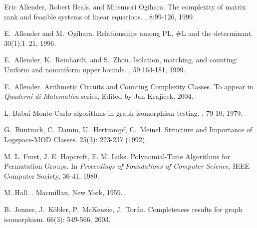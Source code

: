 \documentclass[11pt]{article}
\begin{document}
\begin{thebibliography}{MVV87}

Eric Allender, Robert Beals, and Mitsunori Ogihara.
\newblock The complexity of matrix rank and feasible systems of linear
  equations.
, 8:99-126, 1999.

E.~Allender and M.~Ogihara.
\newblock Relationships among {PL}, \#{L} and the determinant.
30(1):1--21, 1996.

E.~Allender, K.~Reinhardt, and S.~Zhou.
\newblock Isolation, matching, and counting: Uniform and nonuniform upper
  bounds.
, 59:164-181, 1999.

 E.~Allender.  \newblock Arithmetic Circuits
and Counting Complexity Classes.  \newblock To appear in {\em Quaderni
di Matematica} series, Edited by Jan Krajicek, 2004.

L. Babai
\newblock Monte Carlo algorithms in graph isomorphism testing.
, 79-10, 1979.


G.~Buntrock, C.~Damm, U.~Hertrampf, C.~Meinel.
\newblock Structure and Importance of Logspace-MOD Classes.
 25(3): 223-237 (1992).

M. L. Furst, J. E. Hopcroft, E. M. Luks.
\newblock Polynomial-Time Algorithms for Permutation Groups.
\newblock In {\em Proceedings of Foundations of Computer Science,}
IEEE Computer Society, 36-41, 1980.

M. Hall.
.
\newblock Macmillan, New York, 1959.


B.~Jenner, J.~K\"obler, P.~McKenzie, J.~Tor\'an.
\newblock Completeness results for graph isomorphism. 
 66(3): 549-566, 2003.


\end{thebibliography}
\end{document}
